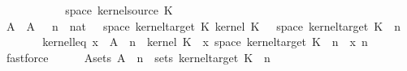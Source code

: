 \begin{isabellebody}
\isanewline
\ \ \ \ \isamarkupfalse%
\ {\isasymomega}\ \isamarkupfalse%
\ {\isasymomega}{\isacharcolon}{\kern0pt}\ {\isachardoublequoteopen}{\isasymomega}\ {\isasymin}\ space\ {\isacharparenleft}{\kern0pt}kernel{\isacharunderscore}{\kern0pt}source\ K{\isacharunderscore}{\kern0pt}{}{\isacharparenright}{\kern0pt}{\isachardoublequoteclose}\isanewline
\ \ \ \ \isamarkupfalse%
\ A\ \ {\isachardoublequoteopen}A\ {\isasymequiv}\ {\isacharparenleft}{\kern0pt}{\isasymlambda}{\isasymomega}\ {\isacharparenleft}{\kern0pt}n\ {\isacharcolon}{\kern0pt}{\isacharcolon}{\kern0pt}\ nat{\isacharparenright}{\kern0pt}{\isachardot}{\kern0pt}\ {\isacharbraceleft}{\kern0pt}{\isasymomega}\ {\isasymin}\ space\ {\isacharparenleft}{\kern0pt}kernel{\isacharunderscore}{\kern0pt}target\ K{\isacharunderscore}{\kern0pt}{}{\isacharparenright}{\kern0pt}{\isachardot}{\kern0pt}\ kernel\ K{\isacharunderscore}{\kern0pt}{}\ {\isacharparenleft}{\kern0pt}{\isasymomega}\ {\isasymomega}\ {\isacharparenleft}{\kern0pt}space\ {\isacharparenleft}{\kern0pt}kernel{\isacharunderscore}{\kern0pt}target\ K{\isacharunderscore}{\kern0pt}{}{\isacharparenright}{\kern0pt}{\isacharparenright}{\kern0pt}\ {\isacharless}{\kern0pt}\ n{\isacharbraceright}{\kern0pt}{\isacharparenright}{\kern0pt}{\isachardoublequoteclose}\isanewline
\ \ \ \ \isamarkupfalse%
\ \isamarkupfalse%
\ kernel{\isacharunderscore}{\kern0pt}leq{\isacharcolon}{\kern0pt}\ {\isachardoublequoteopen}x\ {\isasymin}\ {\isacharparenleft}{\kern0pt}A\ {\isasymomega}\ n{\isacharparenright}{\kern0pt}\ {\isasymLongrightarrow}\ kernel\ K{\isacharunderscore}{\kern0pt}{}\ {\isacharparenleft}{\kern0pt}{\isasymomega}\ x{\isacharparenright}{\kern0pt}\ {\isacharparenleft}{\kern0pt}space\ {\isacharparenleft}{\kern0pt}kernel{\isacharunderscore}{\kern0pt}target\ K{\isacharunderscore}{\kern0pt}{}{\isacharparenright}{\kern0pt}{\isacharparenright}{\kern0pt}\ {\isasymle}\ n{\isachardoublequoteclose}\ \ x\ n\isanewline
\ \ \ \ \ \ \isamarkupfalse%
\ fastforce\isanewline
\ \ \ \ \isamarkupfalse%
\ A{\isacharunderscore}{\kern0pt}sets{\isacharcolon}{\kern0pt}\ {\isachardoublequoteopen}A\ {\isasymomega}\ n\ {\isasymin}\ sets\ {\isacharparenleft}{\kern0pt}kernel{\isacharunderscore}{\kern0pt}target\ K{\isacharunderscore}{\kern0pt}{}{\isacharparenright}{\kern0pt}{\isachardoublequoteclose}\ \ n\isanewline

\end{isabellebody}

